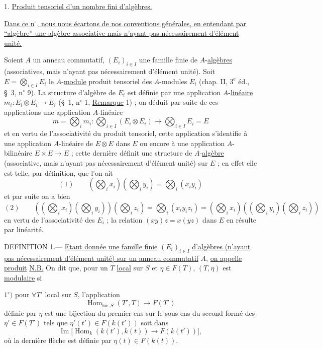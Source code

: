 1. \uline{Produit tensoriel d'un nombre fini d'algèbres.}

\uline{Dans ce n$^\circ$, nous nous écartons de nos conventions générales, en entendant par ``algèbre'' une algèbre associative mais n'ayant pas nécessairement d'élément unité.}

Soient $A$ un anneau commutatif, $(E_i)_{i\in I}$ une famille finie de $A$-\uline{algèbres} (associatives, mais n'ayant pas nécessairement d'élément unité). Soit $E=\bigotimes_{i\in I}E_i$ le $A$-\uline{module} produit tensoriel des $A$-modules $E_i$ (chap. II, $3^{\mathrm e}$ éd., \S\ 3, n$^\circ$ 9). La structure d'algèbre de $E_i$ est définie par une application $A$-\uline{linéaire} $m_i:E_i\otimes E_i\to E_i$ (\S\ 1, n$^\circ$ 1, \uline{Remarque} 1) ; on déduit par suite de ces applications une application $A$-linéaire
\[
m=\bigotimes_i m_i:\bigotimes_{i\in I}(E_i\otimes E_i)\longrightarrow\bigotimes_{i\in I}E_i=E
\]
et en vertu de l'associativité du produit tensoriel, cette application s'identifie à une application $A$-linéaire de $E\otimes E$ dans $E$ ou encore à une application $A$-bilinéaire $E\times E\to E$ ; cette dernière définit une structure de $A$-\uline{algèbre} (associative, mais n'ayant pas nécessairement d'élément unité) sur $E$ ; en effet elle est telle, par définition, que l'on ait
\[
(1)\qquad \left(\bigotimes_i x_i\right)\left(\bigotimes_i y_i\right)=\bigotimes_i(x_i y_i)
\]
et par suite on a bien
\[
(2)\qquad \left(\left(\bigotimes_i x_i\right)\left(\bigotimes_i y_i\right)\right)\left(\bigotimes_i z_i\right)=\bigotimes_i(x_i y_i z_i)=\left(\bigotimes_i x_i\right)\left(\left(\bigotimes_i y_i\right)\left(\bigotimes_i z_i\right)\right)
\]
en vertu de l'associativité des $E_i$ ; la relation $(xy)z=x(yz)$ dans $E$ en résulte par linéarité.

DEFINITION 1.--- \uline{Etant donnée une famille finie} $(E_i)_{i\in I}$ \uline{d'algèbres (n'ayant pas nécessairement d'élément unité) sur un anneau commutatif} $A$, \uline{on appelle produit}
\uline{N.B.} On dit que, pour un $T$ \uline{local} sur $S$ et $\eta\in F(T)$, $(T,\eta)$ est \uline{modulaire}  si

$1^\circ)$ pour $\forall T'$ local sur $S$, l'application
\[
\operatorname{Hom}_{\mathrm{loc},S}(T',T)\longrightarrow F(T')
\]
définie par $\eta$ est une  bijection du premier ens sur le sous-ens du second formé des $\eta'\in F(T')$ tels que $\eta'(t')\in F(k(t'))$ soit dans
\[
\operatorname{Im}\bigl[\operatorname{Hom}_k(k(t'),k(t))\longrightarrow F(k(t'))\bigr],
\]
où la dernière flèche est définie par $\eta(t)\in F(k(t))$.

